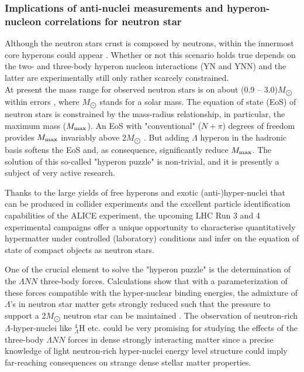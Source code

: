 \subsubsection{Implications of anti-nuclei measurements and hyperon-nucleon correlations for neutron star }

Although the neutron stars crust is  composed by neutrons, within the innermost core hyperons could appear \cite{RMP-88-035004-2016}.
Whether or not this scenario holds true depends on the two- and three-body hyperon nucleon interactions (YN and YNN) and the latter are experimentally still only rather scarcely constrained. \\
At present the mass range for observed neutron stars is on about (0.9 --  3.0)$M_{\bigodot}$ within errors \cite{ARNPS-62-485-2012}, where $M_{\bigodot}$ stands for a solar mass. 
The equation of state (EoS)  of neutron stars is constrained by the mass-radius relationship, in particular, the maximum mass ($M_{\scriptsize{\mbox{max}}}$). An EoS with "conventional" ($N+\pi$) degrees of freedom provides $M_{\scriptsize{\mbox{max}}}$ invariably above 2$M_{\bigodot}$ \cite{HyperfineInteract-233-131-2015,Nature-467-1081-2010,AstrophysJ-832-167-2016}. 
But adding $\Lambda$ hyperon in the hadronic basis softens the EoS and, as consequence, significantly reduce $M_{\scriptsize{\mbox{max}}}$. 
The solution of this so-called "hyperon puzzle" is non-trivial, and it is presently a subject of very active research.

Thanks to the large yields of free hyperons and  exotic (anti-)hyper-nuclei that can be produced in collider experiments and the excellent particle identification capabilities of the ALICE experiment, the upcoming LHC Run 3 and 4 experimental campaigns
offer a unique opportunity to characterise quantitatively hypermatter under controlled (laboratory) conditions and infer on the equation of state of compact objects as neutron stars.

One of the crucial  element to solve the "hyperon puzzle" is the determination of the $\Lambda NN$ three-body forces. 
Calculations show that with a parameterization of these forces compatible with the hyper-nuclear binding energies, the admixture of $\Lambda$'s in neutron star matter gets strongly reduced such that the pressure to support a 2$M_{\bigodot}$ neutron star can be maintained \cite{Lonardoni:2014bwa}. 
The observation of neutron-rich $\Lambda$-hyper-nuclei like $^{4}_{\Lambda}\mbox{H}$ etc. could be very promising for studying the effects of the
three-body $\Lambda NN$ forces in dense strongly interacting matter since a precise knowledge of light neutron-rich hyper-nuclei energy level structure could imply far-reaching consequences on strange dense stellar matter properties.

